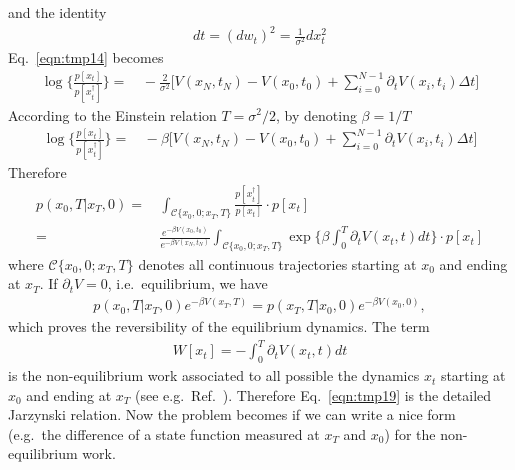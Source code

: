 \documentclass[preprint,unsortedaddress,a4paper,onecolumn]{revtex4-1}
\newcommand{\mc}[0]{\mathcal {C}}
\newcommand{\dt}[0]{\Delta t}
\begin{document}
and the identity
\begin{align}
  dt = (dw_t)^2 = \frac1{\sigma^2} dx_t^2
\end{align}
Eq.~\eqref{eqn:tmp14} becomes
\begin{align}
  \log\bigg\{\frac{  p[x_t] }{ p[x^\dagger_t]} \bigg\}
  =&\,
  -\frac2{\sigma^2}\bigg[
  V(x_N,t_N) - V(x_0,t_0) + \sum_{i=0}^{N-1}\partial_tV(x_i,t_i)\dt
  \bigg]
\end{align}
According to the  Einstein relation $T = \sigma^2/2$, by denoting $\beta = 1/T$
\begin{align}
  \log\bigg\{\frac{  p[x_t] }{ p[x^\dagger_t]} \bigg\}
  =&\,
  -\beta\bigg[
  V(x_N,t_N) - V(x_0,t_0) + \sum_{i=0}^{N-1}\partial_tV(x_i,t_i)\dt
  \bigg]  
\end{align}
Therefore
\begin{align}\nonumber
  p(x_0,T\vert x_T,0)
  =&\,
  \int_{\mc\{x_0,0;x_T,T\}}
  \frac{  p[x^\dagger_t] }{ p[x_t]} \cdot p[x_t] \\\label{eqn:tmp19}
  = &\,
  \frac{e^{-\beta V(x_0,t_0)}}{e^{-\beta V(x_N,t_N)}}
  \int_{\mc\{x_0,0;x_T,T\}}
  \exp\bigg\{
  \beta\int_0^T \partial_t V(x_t,t)dt 
  \bigg\} \cdot p[x_t]
\end{align}
where $\mc\{x_0,0;x_T,T\}$ denotes all continuous trajectories starting at $x_0$ and ending at $x_T$.
If $\partial_t V = 0$, i.e.~equilibrium, we have
\begin{align}
  p(x_0,T\vert x_T,0)e^{-\beta V(x_T,T)} =  p(x_T,T\vert x_0,0) e^{-\beta V(x_0,0)},
\end{align}
which proves the reversibility of the equilibrium dynamics.
The term
\begin{align}
  W[x_t] = - \int_0^T \partial_t V(x_t,t)dt
\end{align}
is the non-equilibrium work associated to all possible
the dynamics $x_t$ starting at $x_0$ and ending at $x_T$ (see e.g.~Ref.~\cite{seifert2012stochastic}).
Therefore Eq.~\eqref{eqn:tmp19} is the detailed Jarzynski relation.
Now the problem becomes if we can write a nice form (e.g.~the difference of a state function measured at $x_T$ and $x_0$) for the non-equilibrium work.


{}

\end{document}
